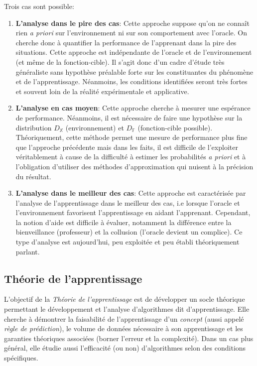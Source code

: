 \noindent Trois cas sont possible:
\begin{enumerate}
    \item \textbf{L'analyse dans le pire des cas}: Cette approche suppose qu'on ne connaît rien \textit{a priori} sur l'environnement ni sur son comportement avec l'oracle. On cherche donc à quantifier la performance de l'apprenant dans la pire des situations. Cette approche est indépendante de l'oracle et de l'environnement (et même de la fonction-cible). Il s'agit donc d'un cadre d'étude très généraliste sans hypothèse préalable forte sur les constituantes du phénomène et de l'apprentissage. Néanmoins, les conditions identifiées seront très fortes et souvent loin de la réalité expérimentale et applicative.

    \item \textbf{L'analyse en cas moyen}: Cette approche cherche à mesurer une espérance de performance. Néanmoins, il est nécessaire de faire une hypothèse sur la distribution $D_\mathbb{X}$ (environnement) et $D_\mathbb{F}$ (fonction-cible possible). Théoriquement, cette méthode permet une mesure de performance plus fine que l'approche précédente mais dans les faits, il est difficile de l'exploiter véritablement à cause de la difficulté à estimer les probabilités \textit{a priori} et à l'obligation d'utiliser des méthodes d'approximation qui nuisent à la précision du résultat.

    \item \textbf{L'analyse dans le meilleur des cas}: Cette approche est caractérisée par l'analyse de l'apprentissage dans le meilleur des cas, i.e lorsque l'oracle et l'environnement favorisent l'apprentissage en aidant l'apprenant. Cependant, la notion d'aide est difficile à évaluer, notamment la différence entre la bienveillance (professeur) et la collusion (l'oracle devient un complice). Ce type d'analyse est aujourd'hui, peu exploitée et peu établi théoriquement parlant.
\end{enumerate}

\subsection{Théorie de l'apprentissage}

\noindent L'objectif de la \textit{Théorie de l'apprentissage} est de développer un socle théorique permettant le développement et l'analyse d'algorithmes dit d'apprentissage. Elle cherche à démontrer la faisabilité de l'apprentissage d'un \textit{concept} (aussi appelé \textit{règle de prédiction}), le volume de données nécessaire à son apprentissage et les garanties théoriques associées (borner l'erreur et la complexité). Dans un cas plus général, elle étudie aussi l'efficacité (ou non) d'algorithmes selon des conditions spécifiques.\\

